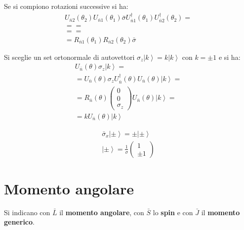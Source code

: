 Se si compiono rotazioni successive si ha:
\begin{equation}\begin{split}
U_{\bar n2}\left(\theta_2\right)U_{\bar n1}\left(\theta_1\right)\bar \sigma U_{\bar n1}^{\dag}\left(\theta_1\right)U_{\bar n2}^{\dag}\left(\theta_2\right)=\\
= =\\
= =\\
=R_{\bar n1}\left(\theta_1\right)R_{\bar n2}\left(\theta_2\right)\bar \sigma
\end{split}\end{equation}

Si sceglie un set ortonormale di autovettori $\sigma_z\left |k \right\rangle=k\left |k \right\rangle$ con $k=\pm 1$ e si ha:
\begin{equation}\begin{split}
U_{\bar n}\left(\theta\right)\sigma_z\left |k \right\rangle=\\
=U_{\bar n}\left(\theta\right)\sigma_z U_{\bar n}^{\dag}\left(\theta\right)U_{\bar n}\left(\theta\right)\left |k \right\rangle=\\
=R_{\bar n}\left(\theta\right)\left(\begin{matrix}0\\0\\ \sigma_z\end{matrix}\right)U_{\bar n}\left(\theta\right)\left |k \right\rangle=\\
=kU_{\bar n}\left(\theta\right)\left |k \right\rangle
\end{split}\end{equation}

\begin{equation}\begin{split}
\bar \sigma_x\left |\pm \right\rangle=\pm\left |\pm \right\rangle \\
\left |\pm \right\rangle=\frac{1}{\sigma}\left(\begin{matrix}1\\ \pm 1\end{matrix}\right)
\end{split}\end{equation}

\section{Momento angolare} %
Si indicano con $\bar L$ il \textbf{momento angolare}, con $\bar S$ lo \textbf{spin} e con $\bar J$ il \textbf{momento generico}.

